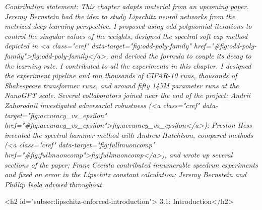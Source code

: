 \textit{Contribution statement: This chapter adapts material from an upcoming paper. Jeremy Bernstein had the idea to study Lipschitz neural networks from the metrized deep learning perspective. I proposed using odd polynomial iterations to control the singular values of the weights, designed the spectral soft cap method depicted in <a class="cref" data-target="fig:odd-poly-family" href="#fig:odd-poly-family">fig:odd-poly-family</a>, and derived the formula to couple its decay to the learning rate. I contributed to all the experiments in this chapter. I designed the experiment pipeline and ran thousands of CIFAR-10 runs, thousands of Shakespeare transformer runs, and around fifty 145M parameter runs at the NanoGPT scale. Several collaborators joined near the end of the project: Andrii Zahorodnii investigated adversarial robustness (<a class="cref" data-target="fig:accuracy_vs_epsilon" href="#fig:accuracy_vs_epsilon">fig:accuracy_vs_epsilon</a>); Preston Hess invented the spectral hammer method with Andrew Hutchison, compared methods (<a class="cref" data-target="fig:fullmuoncomp" href="#fig:fullmuoncomp">fig:fullmuoncomp</a>), and wrote up several sections of the paper; Franz Cecista contributed innumerable speedrun experiments and fixed an error in the Lipschitz constant calculation; Jeremy Bernstein and Phillip Isola advised throughout.}


<h2 id="subsec:lipschitz-enforced-introduction"> 3.1: Introduction</h2>

